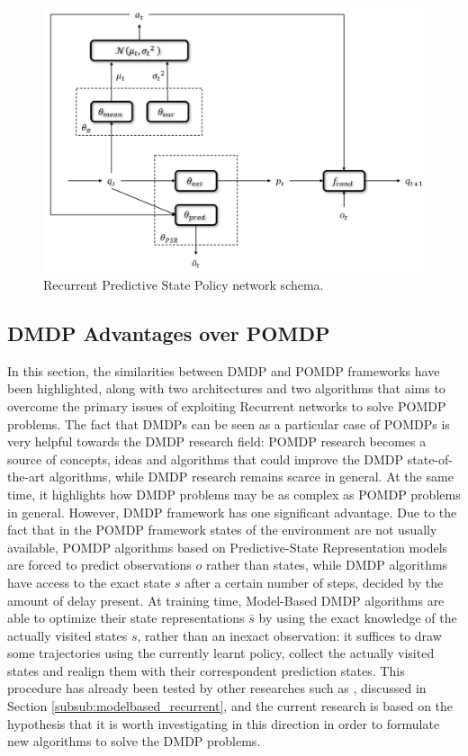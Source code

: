                 \begin{figure}[t]
                    \centering
                    \includegraphics[width=15cm, keepaspectratio]{images/pomdp/pomdp_rpsp.png}
                    \caption{Recurrent Predictive State Policy network schema.}
                    \label{fig:pomdp_rpsp}
                \end{figure}
                
        \newpage        
        \subsection{DMDP Advantages over POMDP}
            In this section, the similarities between DMDP and POMDP frameworks have been highlighted, along with two architectures and two algorithms that aims to overcome the primary issues of exploiting Recurrent networks to solve POMDP problems. The fact that DMDPs can be seen as a particular case of POMDPs is very helpful towards the DMDP research field: POMDP research becomes a source of concepts, ideas and algorithms that could improve the DMDP state-of-the-art algorithms, while DMDP research remains scarce in general. At the same time, it highlights how DMDP problems may be as complex as POMDP problems in general. \newline
            However, DMDP framework has one significant advantage. Due to the fact that in the POMDP framework states of the environment are not usually available, POMDP algorithms based on Predictive-State Representation models are forced to predict observations $o$ rather than states, while DMDP algorithms have access to the exact state $s$ after a certain number of steps, decided by the amount of delay present. At training time, Model-Based DMDP algorithms are able to optimize their state representations $\bar{s}$ by using the exact knowledge of the actually visited states $s$, rather than an inexact observation: it suffices to draw some trajectories using the currently learnt policy, collect the actually visited states and realign them with their correspondent prediction states. This procedure has already been tested by other researches such as , discussed in Section \ref{subsub:modelbased_recurrent}, and the current research is based on the hypothesis that it is worth investigating in this direction in order to formulate new algorithms to solve the DMDP problems.
            